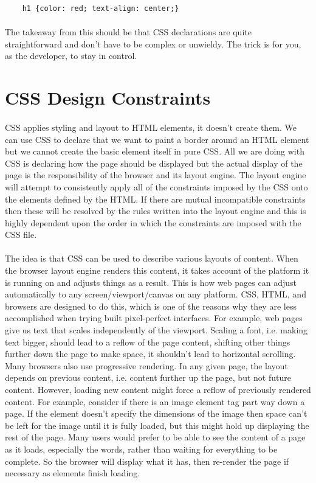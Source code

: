 \begin{lstlisting}
	h1 {color: red; text-align: center;}
\end{lstlisting}

\paragraph{} The takeaway from this should be that CSS declarations are quite straightforward and don't have to be complex or unwieldy. The trick is for you, as the developer, to stay in control.



\section{CSS Design Constraints}
\paragraph{} CSS applies styling and layout to HTML elements, it doesn't create them. We can use CSS to declare that we want to paint a border around an HTML element but we cannot create the basic element itself in pure CSS. All we are doing with CSS is declaring how the page should be displayed but the actual display of the page is the responsibility of the browser and its layout engine. The layout engine will attempt to consistently apply all of the constraints imposed by the CSS onto the elements defined by the HTML. If there are mutual incompatible constraints then these will be resolved by the rules written into the layout engine and this is highly dependent upon the order in which the constraints are imposed with the CSS file.
\paragraph{} The idea is that CSS can be used to describe various layouts of content. When the browser layout engine renders this content, it takes account of the platform it is running on and adjusts things as a result. This is how web pages can adjust automatically to any screen/viewport/canvas on any platform. CSS, HTML, and browsers are designed to do this, which is one of the reasons why they are less accomplished when trying built pixel-perfect interfaces. For example, web pages give us text that scales independently of the viewport. Scaling a font, i.e. making text bigger, should lead to a reflow of the page content, shifting other things further down the page to make space, it shouldn't lead to horizontal scrolling. Many browsers also use progressive rendering. In any given page, the layout depends on previous content, i.e. content further up the page, but not future content. However, loading new content might force a reflow of previously rendered content. For example, consider if there is an image element tag part way down a page. If the element doesn't specify the dimensions of the image then space can't be left for the image until it is fully loaded, but this might hold up displaying the rest of the page. Many users would prefer to be able to see the content of a page as it loads, especially the words, rather than waiting for everything to be complete. So the browser will display what it has, then re-render the page if necessary as elements finish loading.
